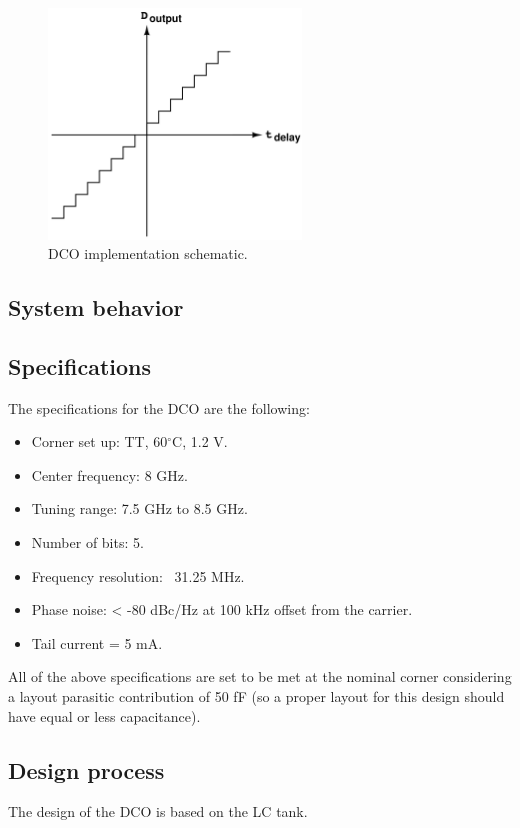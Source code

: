 \begin{figure}[H]
    \centering
    \includegraphics[width=0.6\textwidth]{figures/TDC_shifted_characteristic.png}
    \caption{DCO implementation schematic.}
    \label{fig:DCO_implementation}
\end{figure}

\subsection{System behavior}


\subsection{Specifications}
The specifications for the DCO are the following:
\begin{itemize}
    \item Corner set up: TT, 60$^{\circ}$C, 1.2 V.
    \item Center frequency: 8 GHz.
    \item Tuning range: 7.5 GHz to 8.5 GHz.
    \item Number of bits: 5.
    \item Frequency resolution: ~31.25 MHz.
    \item Phase noise: < -80 dBc/Hz at 100 kHz offset from the carrier.
    \item Tail current = 5 mA.
\end{itemize}
All of the above specifications are set to be met at the nominal corner considering a layout parasitic contribution of 50 fF (so a proper layout for this design should have equal or less capacitance). 


\subsection{Design process}
The design of the DCO is based on the LC tank.

